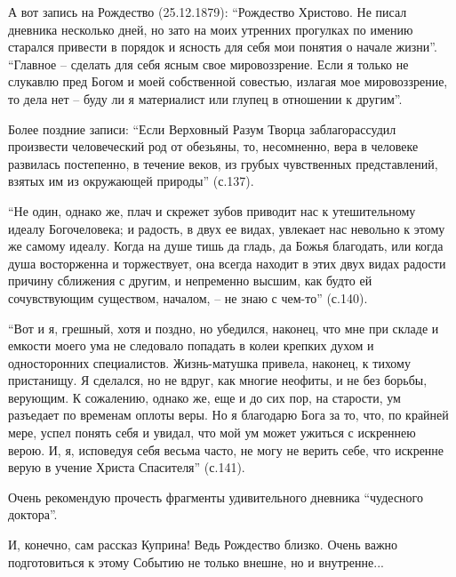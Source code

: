 А вот запись на Рождество (25.12.1879): \enquote{Рождество Христово. Не писал дневника
несколько дней, но зато на моих утренних прогулках по имению старался привести
в порядок и ясность для себя мои понятия о начале жизни}. \enquote{Главное – сделать
для себя ясным свое мировоззрение. Если я только не слукавлю пред Богом и моей
собственной совестью, излагая мое мировоззрение, то дела нет – буду ли я
материалист или глупец в отношении к другим}.

Более поздние записи: \enquote{Если Верховный Разум Творца заблагорассудил произвести
человеческий род от обезьяны, то, несомненно, вера в человеке развилась
постепенно, в течение веков, из грубых чувственных представлений, взятых им из
окружающей природы} (с.137).

\enquote{Не один, однако же, плач и скрежет зубов приводит нас к утешительному идеалу
Богочеловека; и радость, в двух ее видах, увлекает нас невольно к этому же
самому идеалу. Когда на душе тишь да гладь, да Божья благодать, или когда душа
восторженна и торжествует, она всегда находит в этих двух видах радости причину
сближения с другим, и непременно высшим, как будто ей сочувствующим существом,
началом, – не знаю с чем-то} (с.140).

\enquote{Вот и я, грешный, хотя и поздно, но убедился, наконец, что мне при складе и
емкости моего ума не следовало попадать в колеи крепких духом и односторонних
специалистов. Жизнь-матушка привела, наконец, к тихому пристанищу. Я сделался,
но не вдруг, как многие неофиты, и не без борьбы, верующим. К сожалению, однако
же, еще и до сих пор, на старости, ум разъедает по временам оплоты веры. Но я
благодарю Бога за то, что, по крайней мере, успел понять себя и увидал, что мой
ум может ужиться с искреннею верою. И, я, исповедуя себя весьма часто, не могу
не верить себе, что искренне верую в учение Христа Спасителя} (с.141).

Очень рекомендую прочесть фрагменты удивительного дневника \enquote{чудесного доктора}.

И, конечно, сам рассказ Куприна! Ведь Рождество близко. Очень важно
подготовиться к этому Событию не только внешне, но и внутренне...

